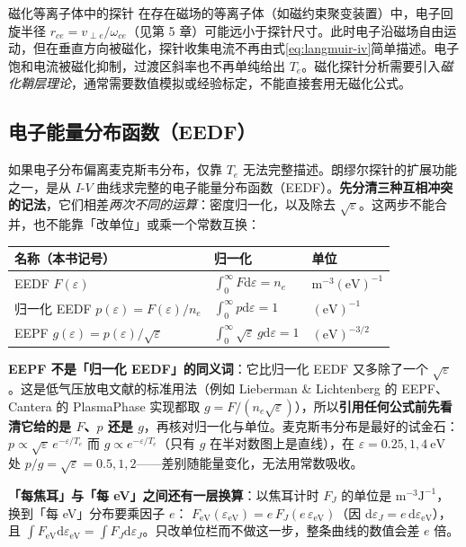 \documentclass[12pt,a4paper,openany,oneside]{book}
\newcommand{\diff}{\mathrm{d}}
\newcommand{\eps}{\varepsilon}
\begin{document}
\begin{warning}{磁化等离子体中的探针}{}
在存在磁场的等离子体（如磁约束聚变装置）中，电子回旋半径 $r_{ce} = v_{\perp e}/\omega_{ce}$（见第 5 章）可能远小于探针尺寸。此时电子沿磁场自由运动，但在垂直方向被磁化，探针收集电流不再由式\eqref{eq:langmuir-iv}简单描述。电子饱和电流被磁化抑制，过渡区斜率也不再单纯给出 $T_e$。磁化探针分析需要引入\emph{磁化鞘层理论}，通常需要数值模拟或经验标定，不能直接套用无磁化公式。
\end{warning}

\subsection{电子能量分布函数（EEDF）}

如果电子分布偏离麦克斯韦分布，仅靠 $T_e$ 无法完整描述。朗缪尔探针的扩展功能之一，是从 $I$-$V$ 曲线求完整的电子能量分布函数（EEDF）。\textbf{先分清三种互相冲突的记法}，它们相差\emph{两次不同的运算}：密度归一化，以及除去 $\sqrt{\eps}$。这两步不能合并，也不能靠「改单位」或乘一个常数互换：

\begin{center}
\begin{tabular}{lll}
\hline
名称（本书记号） & 归一化 & 单位 \\
\hline
EEDF $F(\eps)$ & $\int_0^\infty F\diff\eps=n_e$ & $\mathrm{m^{-3}(eV)^{-1}}$ \\
归一化 EEDF $p(\eps)=F(\eps)/n_e$ & $\int_0^\infty p\diff\eps=1$ & $\mathrm{(eV)^{-1}}$ \\
EEPF $g(\eps)=p(\eps)/\sqrt{\eps}$ & $\int_0^\infty\sqrt{\eps}\,g\diff\eps=1$ & $\mathrm{(eV)^{-3/2}}$ \\
\hline
\end{tabular}
\end{center}

\textbf{EEPF 不是「归一化 EEDF」的同义词}：它比归一化 EEDF 又多除了一个 $\sqrt{\eps}$。这是低气压放电文献的标准用法（例如 Lieberman \& Lichtenberg 的 EEPF、Cantera 的 PlasmaPhase 实现都取 $g=F/(n_e\sqrt{\eps})$），所以\textbf{引用任何公式前先看清它给的是 $F$、$p$ 还是 $g$}，再核对归一化与单位。麦克斯韦分布是最好的试金石：$p\propto\sqrt{\eps}\,e^{-\eps/T_e}$ 而 $g\propto e^{-\eps/T_e}$（只有 $g$ 在半对数图上是直线），在 $\eps=0.25,1,4\ \mathrm{eV}$ 处 $p/g=\sqrt{\eps}=0.5,1,2$——差别随能量变化，无法用常数吸收。

\textbf{「每焦耳」与「每 eV」之间还有一层换算}：以焦耳计时 $F_J$ 的单位是 $\mathrm{m^{-3}J^{-1}}$，换到「每 eV」分布要乘因子 $e$：
$F_{\mathrm{eV}}(\eps_{\mathrm{eV}})=e\,F_J(e\,\eps_{\mathrm{eV}})$（因 $\diff\eps_J=e\,\diff\eps_{\mathrm{eV}}$），且 $\int F_{\mathrm{eV}}\diff\eps_{\mathrm{eV}}=\int F_J\diff\eps_J$。只改单位栏而不做这一步，整条曲线的数值会差 $e$ 倍。
\end{document}
